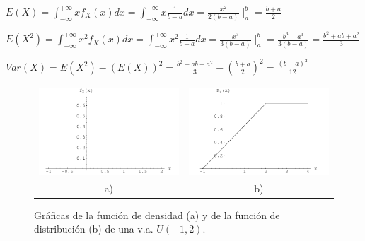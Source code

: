\documentclass[12pt]{report}
\begin{document}
$E(X)=\int_{-\infty}^{+\infty} x f_X(x) dx=\int_{-\infty}^{+\infty} x \frac{1}{b-a} dx =
\frac{x^2}{2(b-a)}\mid _{a}^{b}=\frac{b+a}{2}$

$E(X^2)=\int_{-\infty}^{+\infty} x^2 f_X(x) dx=\int_{-\infty}^{+\infty} x^2 \frac{1}{b-a}
dx =\frac{x^3}{3(b-a)}\mid_{a}^{b} =\frac{b^3-a^3}{3(b-a)}=\frac{b^2+ab+a^2}{3}$

$Var(X)=E(X^2)-(E(X))^2=\frac{b^2+ab+a^2}{3}-(\frac{b+a}{2})^2=\frac{(b-a)^2}{12}$

\begin{figure}[h]
\begin{center}
\begin{tabular}{cc}       \includegraphics[scale=0.75]{densidaduniforme12}
&

       \includegraphics[scale=0.75]{distribucionuniforme12}\\ a) & b) \end{tabular}
\end{center}
       \caption{ Gráficas de la función de densidad (a)  y de la función de distribución (b) de una v.a. $U(-1,2)$.}
        \end{figure}%
\end{document}

